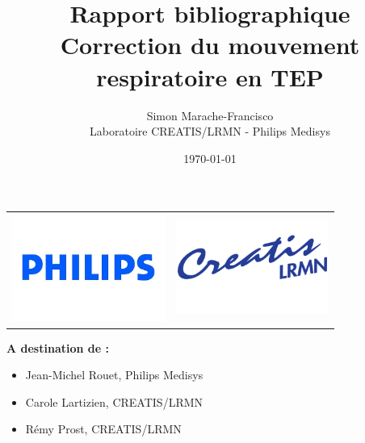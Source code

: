 \documentclass[12pt]{book}
\title{\Huge{Rapport bibliographique}\\\Large{Correction du mouvement respiratoire en TEP}}
\author{
        \vspace{2cm}
        Simon Marache-Francisco \\
        Laboratoire CREATIS/LRMN - Philips Medisys\\
        \vspace{2cm}
}
\date{\today}
\begin{document}
\addtolength{\parskip}{0.5em}


\def\FROC{Free-ROC}
\def\ROC{ROC}

\newcommand{\todo}[1]{
\addcontentsline{toc}{subsection}{\textbf{Todo:} #1}
$\|$\textbf{A Faire : }#1$\|$
}


\maketitle
\thispagestyle{empty}

\begin{center}
	\begin{tabular}{c c}
		\includegraphics[width=5cm]{images/logoPhilips} & \includegraphics[width=5cm]{images/logoCREATIS}
	\end{tabular}
\end{center}


\vfill

\textbf{A destination de :}
\begin{itemize}
    \item Jean-Michel Rouet, Philips Medisys
    \item Carole Lartizien, CREATIS/LRMN
    \item Rémy Prost, CREATIS/LRMN
\end{itemize}
\newpage

\tableofcontents
\end{document}
